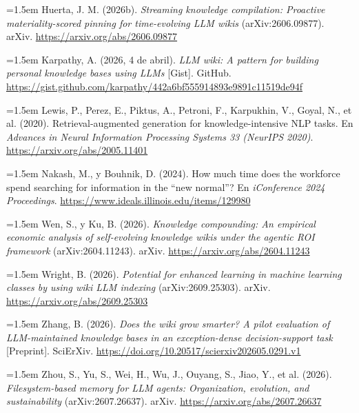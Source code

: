 \documentclass[11pt,letterpaper]{article}
\newcommand{\refhang}[1]{\par\noindent\hangindent=1.5em\hangafter=1 #1\par}
\begin{document}
\refhang{Huerta, J. M. (2026b). \textit{Streaming knowledge compilation: Proactive materiality-scored pinning for time-evolving LLM wikis} (arXiv:2606.09877). arXiv. \url{https://arxiv.org/abs/2606.09877}}

\refhang{Karpathy, A. (2026, 4 de abril). \textit{LLM wiki: A pattern for building personal knowledge bases using LLMs} [Gist]. GitHub. \url{https://gist.github.com/karpathy/442a6bf555914893e9891c11519de94f}}

\refhang{Lewis, P., Perez, E., Piktus, A., Petroni, F., Karpukhin, V., Goyal, N., et al. (2020). Retrieval-augmented generation for knowledge-intensive NLP tasks. En \textit{Advances in Neural Information Processing Systems 33 (NeurIPS 2020)}. \url{https://arxiv.org/abs/2005.11401}}

\refhang{Nakash, M., y Bouhnik, D. (2024). How much time does the workforce spend searching for information in the ``new normal''? En \textit{iConference 2024 Proceedings}. \url{https://www.ideals.illinois.edu/items/129980}}

\refhang{Wen, S., y Ku, B. (2026). \textit{Knowledge compounding: An empirical economic analysis of self-evolving knowledge wikis under the agentic ROI framework} (arXiv:2604.11243). arXiv. \url{https://arxiv.org/abs/2604.11243}}

\refhang{Wright, B. (2026). \textit{Potential for enhanced learning in machine learning classes by using wiki LLM indexing} (arXiv:2609.25303). arXiv. \url{https://arxiv.org/abs/2609.25303}}

\refhang{Zhang, B. (2026). \textit{Does the wiki grow smarter? A pilot evaluation of LLM-maintained knowledge bases in an exception-dense decision-support task} [Preprint]. SciErXiv. \url{https://doi.org/10.20517/scierxiv202605.0291.v1}}

\refhang{Zhou, S., Yu, S., Wei, H., Wu, J., Ouyang, S., Jiao, Y., et al. (2026). \textit{Filesystem-based memory for LLM agents: Organization, evolution, and sustainability} (arXiv:2607.26637). arXiv. \url{https://arxiv.org/abs/2607.26637}}

\normalsize
\end{document}
